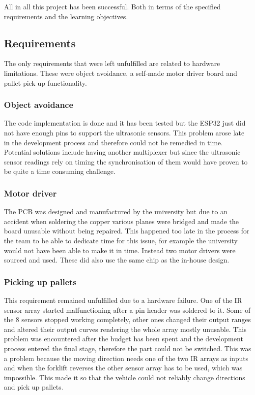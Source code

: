 \documentclass[report.tex]{subfiles}
\begin{document}
All in all this project has been successful. Both in terms of the specified requirements and the learning objectives.

\subsection{Requirements}

The only requirements that were left unfulfilled are related to hardware limitations.
These were object avoidance, a self-made motor driver board and pallet pick up functionality.

\subsubsection{Object avoidance}

The code implementation is done and it has been tested but the ESP32 just did not have enough pins to support the ultrasonic sensors.
This problem arose late in the development process and therefore could not be remedied in time. Potential solutions include having 
another multiplexer but since the ultrasonic sensor readings rely on timing the synchronisation of them would have proven to be 
quite a time consuming challenge.

\subsubsection{Motor driver}

The PCB was designed and manufactured by the university but due to an accident when soldering the copper various planes were bridged
and made the board unusable without being repaired. This happened too late in the process for the team to be able to dedicate 
time for this issue, for example the university would not have been able to make it in time.
Instead two motor drivers were sourced and used. These did also use the same chip as the in-house design. 

\subsubsection{Picking up pallets}

This requirement remained unfulfilled due to a hardware failure. One of the IR sensor array started malfunctioning 
after a pin header was soldered to it. Some of the 8 sensors stopped working completely, other ones changed their output
ranges and altered their output curves rendering the whole array mostly unusable. This problem was encountered after the 
budget has been spent and the development process entered the final stage, therefore the part could not be switched.
This was a problem because the moving direction needs one of the two IR arrays as inputs and when the forklift reverses
the other sensor array has to be used, which was impossible. This made it so that the vehicle could not reliably change directions
and pick up pallets.
\end{document}
